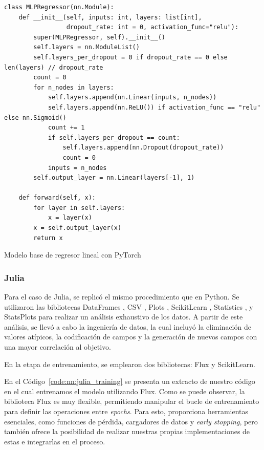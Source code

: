 \documentclass[11pt]{article}
\let\Oldsubsubsection\subsubsection
\renewcommand{\subsubsection}{\FloatBarrier\Oldsubsubsection}
\newcommand{\english}[1]{\textit{#1}}
\begin{document}
\begin{listing}[H]
\begin{verbatim}
class MLPRegressor(nn.Module):
    def __init__(self, inputs: int, layers: list[int],
                 dropout_rate: int = 0, activation_func="relu"):
        super(MLPRegressor, self).__init__()
        self.layers = nn.ModuleList()
        self.layers_per_dropout = 0 if dropout_rate == 0 else len(layers) // dropout_rate
        count = 0
        for n_nodes in layers:
            self.layers.append(nn.Linear(inputs, n_nodes))
            self.layers.append(nn.ReLU()) if activation_func == "relu" else nn.Sigmoid()
            count += 1
            if self.layers_per_dropout == count:
                self.layers.append(nn.Dropout(dropout_rate))
                count = 0
            inputs = n_nodes
        self.output_layer = nn.Linear(layers[-1], 1)
        
    def forward(self, x):
        for layer in self.layers:
            x = layer(x)
        x = self.output_layer(x)
        return x
\end{verbatim}
\caption{Modelo base de regresor lineal con PyTorch}
\label{code:nn:python_pytorch}
\end{listing}

\subsubsection{Julia}

Para el caso de Julia, se replicó el mismo procedimiento que en Python. Se utilizaron las bibliotecas DataFrames \cite{jl:lib:dataframe}, CSV \cite{jl:lib:csv}, Plots \cite{jl:lib:plots}, ScikitLearn \cite{jl:lib:scikitlearn}, Statistics \cite{jl:lib:statitics}, y StatsPlots \cite{jl:lib:statsplots} para realizar un análisis exhaustivo de los datos. A partir de este análisis, se llevó a cabo la ingeniería de datos, la cual incluyó la eliminación de valores atípicos, la codificación de campos y la generación de nuevos campos con una mayor correlación al objetivo.

En la etapa de entrenamiento, se emplearon dos bibliotecas: Flux \cite{jl:lib:flux} y ScikitLearn. 

En el Código~\ref{code:nn:julia_training} se presenta un extracto de nuestro código en el cual entrenamos el modelo utilizando Flux. Como se puede observar, la biblioteca Flux es muy flexible, permitiendo manipular el bucle de entrenamiento para definir las operaciones entre \english{epochs}. Para esto, proporciona herramientas esenciales, como funciones de pérdida, cargadores de datos y \textit{early stopping}, pero también ofrece la posibilidad de realizar nuestras propias implementaciones de estas e integrarlas en el proceso.
\end{document}
